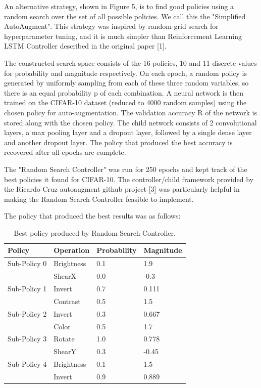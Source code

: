 \documentclass[10pt,twocolumn,letterpaper]{article}
\begin{document}
An alternative strategy, shown in Figure 5, is to find good policies using a random search over the set of all possible policies. We call this the "Simplified AutoAugment".  This strategy was inspired by random grid search for hyperparameter tuning, and it is much simpler than Reinforcement Learning LSTM Controller described in the original paper [1].

The constructed search space consists of the 16 policies, 10 and 11 discrete values for probability and magnitude respectively.  On each epoch, a random policy is generated by uniformly sampling from each of these three random variables, so there is an equal probability p of each combination. A neural network is then trained on the CIFAR-10 dataset (reduced to 4000 random samples) using the chosen policy for auto-augmentation. The validation accuracy R of the network is stored along with the chosen policy. The child network consists of 2 convolutional layers, a max pooling layer and a dropout layer, followed by a single dense layer and another dropout layer. The policy that produced the best accuracy is recovered after all epochs are complete.

The "Random Search Controller" was run for 250 epochs and kept track of the best policies it found for CIFAR-10. The controller/child framework provided by the Ricardo Cruz autoaugment github project [3] was particularly helpful in making the Random Search Controller feasible to implement.

The policy that produced the best results was as follows:

        \begin{table}[h]
            \begin{tabular}{llll}
                \hline
                Policy &Operation &Probability&Magnitude   \\ \hline
                Sub-Policy 0 &Brightness &0.1&1.9\\
                &ShearX &0.0 &-0.3\\

                Sub-Policy 1 &Invert &0.7&0.111\\
                &Contrast &0.5 &1.5\\

                Sub-Policy 2 &Invert &0.3&0.667\\
                &Color &0.5 &1.7\\

                Sub-Policy 3 &Rotate &1.0&0.778\\
                &ShearY &0.3 &-0.45\\

                Sub-Policy 4 &Brightness &0.1&1.5\\
                &Invert &0.9 &0.889\\
                \hline
            \end{tabular}
            \\
            \caption{Best policy produced by Random Search Controller.}
        \end{table}
\end{document}
